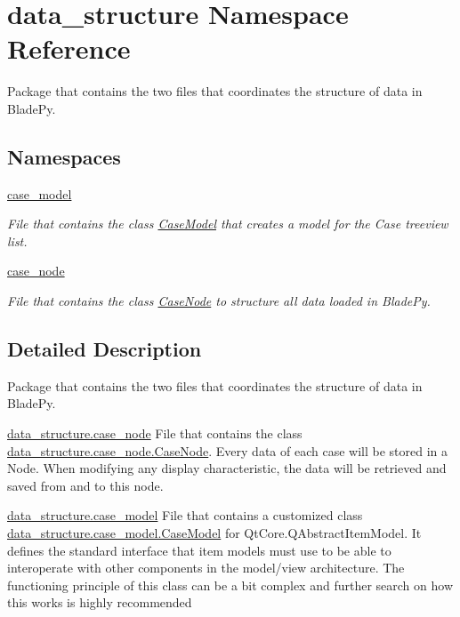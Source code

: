 \hypertarget{a00051}{}\section{data\+\_\+structure Namespace Reference}
\label{a00051}


Package that contains the two files that coordinates the structure of data in Blade\+Py.  


\subsection*{Namespaces}
\begin{DoxyCompactItemize}
\item 
 \hyperlink{a00052}{case\+\_\+model}
\begin{DoxyCompactList}\small\item\em File that contains the class \hyperlink{a00082}{Case\+Model} that creates a model for the Case treeview list. \end{DoxyCompactList}\item 
 \hyperlink{a00053}{case\+\_\+node}
\begin{DoxyCompactList}\small\item\em File that contains the class \hyperlink{a00086}{Case\+Node} to structure all data loaded in Blade\+Py. \end{DoxyCompactList}\end{DoxyCompactItemize}


\subsection{Detailed Description}
Package that contains the two files that coordinates the structure of data in Blade\+Py. 

\begin{DoxyItemize}
\item {\ttfamily \hyperlink{a00053}{data\+\_\+structure.\+case\+\_\+node}} File that contains the class \hyperlink{a00086}{data\+\_\+structure.\+case\+\_\+node.\+Case\+Node}. Every data of each case will be stored in a Node. When modifying any display characteristic, the data will be retrieved and saved from and to this node.\end{DoxyItemize}
\begin{DoxyItemize}
\item {\ttfamily \hyperlink{a00052}{data\+\_\+structure.\+case\+\_\+model}} File that contains a customized class \hyperlink{a00082}{data\+\_\+structure.\+case\+\_\+model.\+Case\+Model} for Qt\+Core.\+Q\+Abstract\+Item\+Model. It defines the standard interface that item models must use to be able to interoperate with other components in the model/view architecture. The functioning principle of this class can be a bit complex and further search on how this works is highly recommended \end{DoxyItemize}
